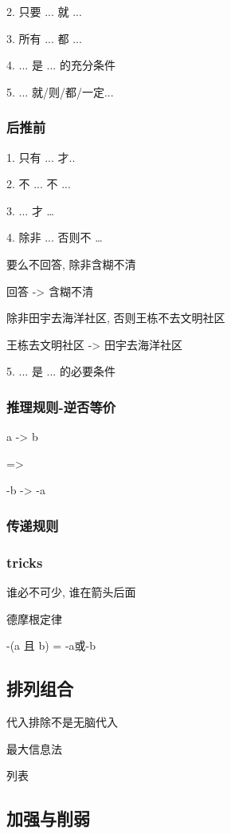 \documentclass[UTF8]{ctexart}
\begin{document}
2. 只要 ... 就 ...

3. 所有 ... 都 ...

4. ... 是 ... 的充分条件

5. ... 就/则/都/一定...

\subsubsection{后推前}

1. 只有 ... 才..

2. 不 ... 不 ...

3. ... 才 \dots

4. 除非 ... 否则不 \dots

要么不回答, 除非含糊不清

回答 -> 含糊不清

除非田宇去海洋社区, 否则王栋不去文明社区

王栋去文明社区 -> 田宇去海洋社区

5. ... 是 ... 的必要条件

\subsubsection{推理规则-逆否等价}

a -> b

=>

-b -> -a

\subsubsection{传递规则}

\subsubsection{tricks}

谁必不可少, 谁在箭头后面

德摩根定律

-(a 且 b) = -a或-b

\subsection{排列组合}

代入排除不是无脑代入


最大信息法

列表

\subsection{加强与削弱}
\end{document}

